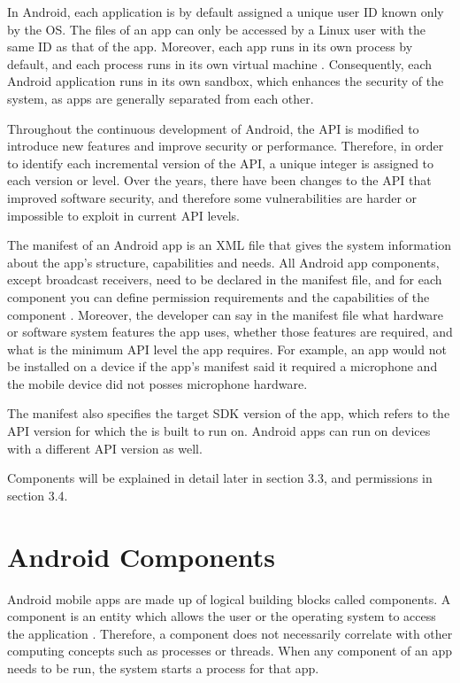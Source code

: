     In Android, each application is by default assigned a unique user ID known only by the OS. The files of an app can only be accessed by a Linux user with the same ID as that of the app. Moreover, each app runs in its own process by default, and each process runs in its own virtual machine \cite{android_os_fundamentals}. Consequently, each Android application runs in its own sandbox, which enhances the security of the system, as apps are generally separated from each other.
    
    Throughout the continuous development of Android, the API is modified to introduce new features and improve security or performance. Therefore, in order to identify each incremental version of the API, a unique integer is assigned to each version or level. Over the years, there have been changes to the API that improved software security, and therefore some vulnerabilities are harder or impossible to exploit in current API levels.
    
    The manifest of an Android app is an XML file that gives the system information about the app’s structure, capabilities and needs. All Android app components, except broadcast receivers, need to be declared in the manifest file, and for each component you can define permission requirements and the capabilities of the component \cite{android_app_fundamentals}. Moreover, the developer can say in the manifest file what hardware or software system features the app uses, whether those features are required, and what is the minimum API level the app requires. For example, an app would not be installed on a device if the app’s manifest said it required a microphone and the mobile device did not posses microphone hardware.
    
    The manifest also specifies the target SDK version of the app, which refers to the API version for which the is built to run on. Android apps can run on devices with a different API version as well.
    
    Components will be explained in detail later in section 3.3, and permissions in section 3.4.
    
    \section{Android Components}
        \label{sec:android_components}
        
    Android mobile apps are made up of logical building blocks called components. A component is an entity which allows the user or the operating system to access the application \cite{android_app_fundamentals}. Therefore, a component does not necessarily correlate with other computing concepts such as processes or threads. When any component of an app needs to be run, the system starts a process for that app.
    
